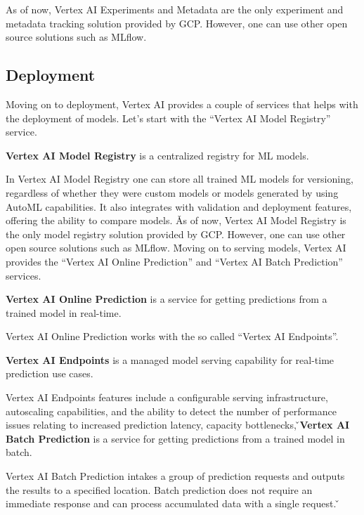 As of now, Vertex AI Experiments and Metadata are the only experiment and metadata tracking solution provided by GCP\@.
However, one can use other open source solutions such as MLflow.

\subsection{Deployment}

Moving on to deployment, Vertex AI provides a couple of services that helps with the deployment of models. Let's start
with the ``Vertex AI Model Registry'' service.

\textbf{Vertex AI Model Registry} is a centralized registry for ML models.
\ed

In Vertex AI Model Registry one can store all trained ML models for versioning, regardless of whether they were
custom models or models generated by using AutoML capabilities. It also integrates with validation and deployment
features, offering the ability to compare models. \v

As of now, Vertex AI Model Registry is the only model registry solution provided by GCP\@. However, one can use other
open source solutions such as MLflow. \v

Moving on to serving models, Vertex AI provides the ``Vertex AI Online Prediction'' and ``Vertex AI Batch Prediction''
services.

\textbf{Vertex AI Online Prediction} is a service for getting predictions from a trained model in real-time.
\ed

Vertex AI Online Prediction works with the so called ``Vertex AI Endpoints''.

\textbf{Vertex AI Endpoints} is a managed model serving capability for real-time prediction use cases.
\ed

Vertex AI Endpoints features include a configurable serving infrastructure, autoscaling capabilities, and the
ability to detect the number of performance issues relating to increased prediction latency, capacity bottlenecks, \v

\textbf{Vertex AI Batch Prediction} is a service for getting predictions from a trained model in batch.
\ed

Vertex AI Batch Prediction intakes a group of prediction requests and outputs the results to a specified location. Batch
prediction does not require an immediate response and can process accumulated data with a single request. \v

